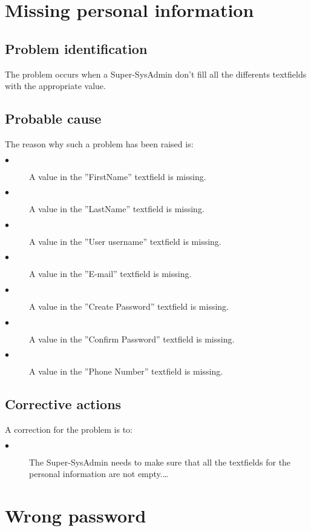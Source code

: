 \section{Missing personal information} 

\subsection{Problem identification}
The problem occurs when a Super-SysAdmin don't fill all the differents
textfields with the appropriate value.
\subsection{Probable cause}

The reason why such a problem has been raised is:\\
\begin{description}
\item[$\bullet$] A value in the ''FirstName'' textfield is missing.
\item[$\bullet$] A value in the ''LastName'' textfield is missing.
\item[$\bullet$] A value in the ''User username'' textfield is missing.
\item[$\bullet$] A value in the ''E-mail'' textfield is missing.
\item[$\bullet$] A value in the ''Create Password'' textfield is missing.
\item[$\bullet$] A value in the ''Confirm Password'' textfield is missing.
\item[$\bullet$] A value in the ''Phone Number'' textfield is missing.

\end{description}


\subsection{Corrective actions}

A correction for the problem is to:\\
\begin{description}
\item[$\bullet$] The Super-SysAdmin needs to make sure that all the textfields
for the personal information are not empty.\ldots

\end{description}


\section{Wrong password} 

